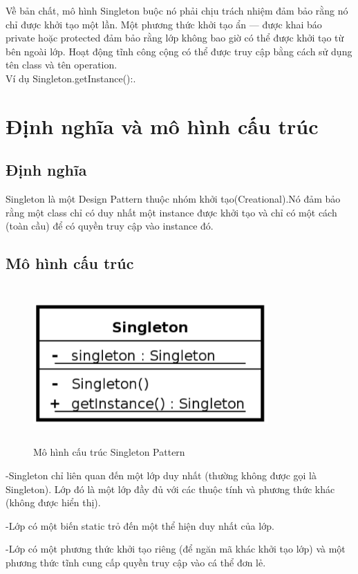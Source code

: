 Về bản chất, mô hình Singleton buộc nó phải chịu trách nhiệm đảm bảo rằng nó chỉ được khởi tạo một lần. Một phương thức khởi tạo ẩn — được khai báo private hoặc protected đảm bảo rằng lớp không bao giờ có thể được khởi tạo từ bên ngoài lớp. Hoạt động tĩnh công cộng có thể được truy cập bằng cách sử dụng tên class và tên operation.\\Ví dụ Singleton.getInstance():.

\section{Định nghĩa và mô hình cấu trúc}

\subsection{Định nghĩa}
Singleton là một Design Pattern thuộc nhóm khởi tạo(Creational).Nó đảm bảo rằng một class chỉ có duy nhất một instance được khởi tạo và chỉ có một cách (toàn cầu) để có quyền truy cập vào instance đó.

\subsection{Mô hình cấu trúc}
\begin{figure}[!htb]
    \centering
    \includegraphics[height=6cm,width=9cm] {fig/Singleton/structure_singleton.png}
    \caption{Mô hình cấu trúc Singleton Pattern}
    \label{fig:structure_singleton}
\end{figure}

-Singleton chỉ liên quan đến một lớp duy nhất (thường không được gọi là Singleton). Lớp đó là một lớp đầy đủ với các thuộc tính và phương thức khác (không được hiển thị).
    
-Lớp có một biến static trỏ đến một thể hiện duy nhất của lớp.
    
-Lớp có một phương thức khởi tạo riêng (để ngăn mã khác khởi tạo lớp) và một phương thức tĩnh cung cấp quyền truy cập vào cá thể đơn lẻ.

